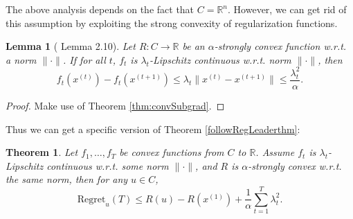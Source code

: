 \documentclass[openany]{book}
\newtheorem{lemma}{Lemma}[chapter]
\newtheorem{theorem}{Theorem}[chapter]
\theoremstyle{definition}
\theoremstyle{remark}
\begin{document}
The above analysis depends on the fact that $C=\mathbb{R}^n$. However, we can get rid of this assumption by exploiting the strong convexity of regularization functions.
\begin{lemma}[\cite{S11} Lemma 2.10]
    Let $R:C\to \mathbb{R}$ be an $\alpha$-strongly convex function w.r.t. a norm $\|\cdot\|$. If for all $t$, $f_t$ is $\lambda_t$-Lipschitz continuous w.r.t. norm $\|\cdot\|$, then
    \begin{equation}
        f_t(x^{(t)})-f_t(x^{(t+1)})\le\lambda_t\|x^{(t)}-x^{(t+1)}\|\le \frac{\lambda_t^2}{\alpha}.
    \end{equation}
\end{lemma}
\begin{proof}
    Make use of Theorem \ref{thm:convSubgrad}.
\end{proof}
Thus we can get a specific version of Theorem \ref{followRegLeaderthm}:
\begin{theorem}\label{followRegLeaderLipst}
    Let $f_1,\ldots,f_T$ be convex functions from $C$ to $\mathbb{R}$. Assume $f_t$ is $\lambda_t$-Lipschitz continuous w.r.t. some norm $\|\cdot\|$, and $R$ is $\alpha$-strongly convex w.r.t. the same norm, then for any $u\in C$,
    \begin{equation}
        \mathrm{Regret}_u(T)\le R(u)-R(x^{(1)})+\frac{1}{\alpha}\sum_{t=1}^{T}\lambda_t^2.
    \end{equation}
\end{theorem}
\end{document}
